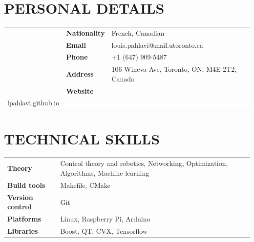 \documentclass{ResumeTemplate}
\begin{document}
	\fontsize{11.5}{12}\selectfont
	

	\centering{}

	\subsection{~}

	\raggedright\begin{minipage}[c]{0.75\linewidth} 

		
		\section{PERSONAL DETAILS}
		
		\noindent\begin{tabularx}{\linewidth}{l>{\bfseries}lX}
		   \passportsymbol & Nationality & French, Canadian \\
		   \emailsymbol    & Email       &  louis.pahlavi@mail.utoronto.ca\\
		   \phonesymbol    & Phone       & +1 (647) 909-5487 \\
		   \mailsymbol     & Address     & 106 Wineva Ave, Toronto, ON, M4E 2T2, Canada \\
		   \homepagesymbol & Website     & \href{https:\\lpahlavi.github.io}{lpahlavi.github.io}
		\end{tabularx}

		
		\section{TECHNICAL SKILLS}
		
		\noindent\begin{tabularx}{\linewidth}{>{\bfseries}lX}
		   Theory          & Control theory and robotics, Networking, Optimization, Algorithms, Machine learning \\
		   Build tools     & Makefile, CMake \\
		   Version control & Git \\
		   Platforms       & Linux, Raspberry Pi, Arduino \\
		   Libraries       & Boost, QT, CVX, Tensorflow \\
		\end{tabularx}


\end{minipage}
\end{document}
